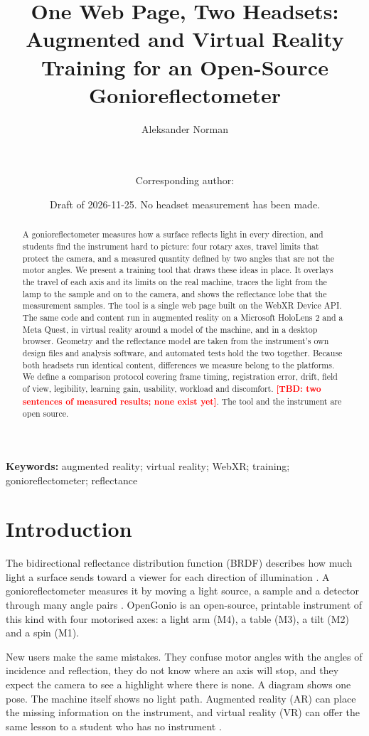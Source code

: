 \documentclass[11pt]{article}
\title{One Web Page, Two Headsets: Augmented and Virtual Reality Training for an Open-Source Gonioreflectometer}
\author{Aleksander Norman \and \tbd{co-authors and order}\\[2pt]
\small \tbd{affiliations: department, institution, city, state, country}\\
\small Corresponding author: \tbd{name, e-mail, ORCID}}
\date{Draft of 2026-11-25. No headset measurement has been made.}
\newcommand{\tbd}[1]{\textcolor{red}{\textbf{[TBD: #1]}}}
\begin{document}
\maketitle

\begin{abstract}
A gonioreflectometer measures how a surface reflects light in every direction, and students find the instrument hard
to picture: four rotary axes, travel limits that protect the camera, and a measured quantity defined by two angles
that are not the motor angles. We present a training tool that draws these ideas in place. It overlays the travel of
each axis and its limits on the real machine, traces the light from the lamp to the sample and on to the camera, and
shows the reflectance lobe that the measurement samples. The tool is a single web page built on the WebXR Device API.
The same code and content run in augmented reality on a Microsoft HoloLens 2 and a Meta Quest, in virtual reality
around a model of the machine, and in a desktop browser. Geometry and the reflectance model are taken from the
instrument's own design files and analysis software, and automated tests hold the two together. Because both headsets
run identical content, differences we measure belong to the platforms. We define a comparison protocol covering frame
timing, registration error, drift, field of view, legibility, learning gain, usability, workload and discomfort.
\tbd{two sentences of measured results; none exist yet}. The tool and the instrument are open source.
\end{abstract}

\noindent\textbf{Keywords:} augmented reality; virtual reality; WebXR; training; gonioreflectometer; reflectance

\section{Introduction}
The bidirectional reflectance distribution function (BRDF) describes how much light a surface sends toward a viewer
for each direction of illumination \parencite{G1}. A gonioreflectometer measures it by moving a light source, a sample
and a detector through many angle pairs \parencite{R1}. OpenGonio is an open-source, printable instrument of this kind with four
motorised axes: a light arm (M4), a table (M3), a tilt (M2) and a spin (M1).

New users make the same mistakes. They confuse motor angles with the angles of incidence and reflection, they do not
know where an axis will stop, and they expect the camera to see a highlight where there is none. A diagram shows one
pose. The machine itself shows no light path. Augmented reality (AR) can place the missing information on the
instrument, and virtual reality (VR) can offer the same lesson to a student who has no instrument
\parencite{X8,X12,X13}.
\end{document}
